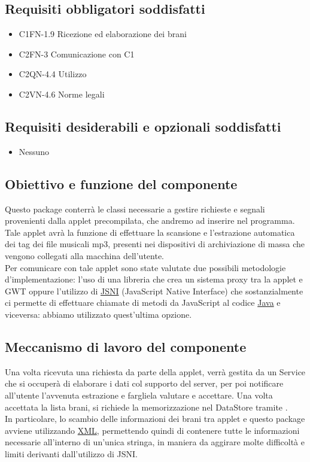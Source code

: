 \subsection*{Requisiti obbligatori soddisfatti}
\begin{itemize}
    \item C1FN-1.9 Ricezione ed elaborazione dei brani
    \item C2FN-3 Comunicazione con C1
    \item C2QN-4.4 Utilizzo
    \item C2VN-4.6 Norme legali
\end{itemize}
\subsection*{Requisiti desiderabili e opzionali soddisfatti}
\begin{itemize}
    \item Nessuno
\end{itemize}
\subsection*{Obiettivo e funzione del componente}
Questo package conterr\`a le classi necessarie a gestire richieste e segnali
provenienti dalla applet precompilata, che andremo ad inserire nel programma.
Tale applet avr\`a la funzione di effettuare la scansione e l'estrazione
automatica dei tag dei file musicali mp3, presenti nei dispositivi di
archiviazione di massa che vengono collegati alla macchina dell'utente.\\
Per comunicare con tale applet sono state valutate due possibili metodologie
d'implementazione: l'uso di una libreria che crea un sistema proxy tra la applet
e GWT oppure l'utilizzo di \underline{JSNI} (JavaScript Native Interface) che
sostanzialmente ci permette di effettuare chiamate di metodi da JavaScript al
codice \underline{Java} e viceversa: abbiamo utilizzato quest'ultima opzione.
\subsection*{Meccanismo di lavoro del componente}
Una volta ricevuta una richiesta da parte della applet, verr\`a gestita da un
Service che si occuper\`a di elaborare i dati col supporto del server, per poi
notificare all'utente l'avvenuta estrazione e fargliela valutare e accettare.
Una volta accettata la lista brani, si richiede la memorizzazione nel DataStore
tramite .\\
In particolare, lo scambio delle informazioni dei brani tra applet e questo
package avviene utilizzando \underline{XML}, permettendo quindi di contenere
tutte le informazioni necessarie all'interno di un'unica stringa, in maniera da
aggirare molte difficolt\`a e limiti derivanti dall'utilizzo di JSNI.
